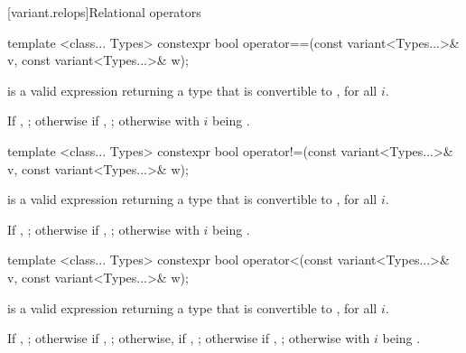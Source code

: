 [variant.relops]{Relational operators}

%
\begin{itemdecl}
template <class... Types>
  constexpr bool operator==(const variant<Types...>& v, const variant<Types...>& w);
\end{itemdecl}

\begin{itemdescr}
\pnum
\requires
{} is a valid expression returning a type that is
convertible to , for all $i$.

\pnum
\returns
If , ;
otherwise if , ;
otherwise  with $i$ being .
\end{itemdescr}

%
\begin{itemdecl}
template <class... Types>
  constexpr bool operator!=(const variant<Types...>& v, const variant<Types...>& w);
\end{itemdecl}

\begin{itemdescr}
\pnum
\requires
{} is a valid expression returning a type that is
convertible to , for all $i$.

\pnum
\returns
If , ;
otherwise if , ;
otherwise  with $i$ being .
\end{itemdescr}

%
\begin{itemdecl}
template <class... Types>
  constexpr bool operator<(const variant<Types...>& v, const variant<Types...>& w);
\end{itemdecl}

\begin{itemdescr}
\pnum
\requires
{} is a valid expression returning a type that is
convertible to , for all $i$.

\pnum
\returns
If , ;
otherwise if , ;
otherwise, if , ;
otherwise if , ;
otherwise  with $i$ being .
\end{itemdescr}

